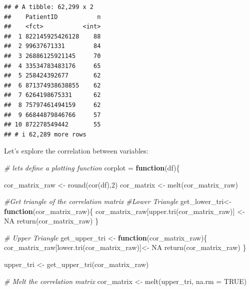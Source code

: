 \documentclass[
]{article}
\newenvironment{Shaded}{\begin{snugshade}}{\end{snugshade}}
\newcommand{\AttributeTok}[1]{\textcolor[rgb]{0.77,0.63,0.00}{#1}}
\newcommand{\CommentTok}[1]{\textcolor[rgb]{0.56,0.35,0.01}{\textit{#1}}}
\newcommand{\ConstantTok}[1]{\textcolor[rgb]{0.00,0.00,0.00}{#1}}
\newcommand{\ControlFlowTok}[1]{\textcolor[rgb]{0.13,0.29,0.53}{\textbf{#1}}}
\newcommand{\DecValTok}[1]{\textcolor[rgb]{0.00,0.00,0.81}{#1}}
\newcommand{\FunctionTok}[1]{\textcolor[rgb]{0.00,0.00,0.00}{#1}}
\newcommand{\NormalTok}[1]{#1}
\newcommand{\OtherTok}[1]{\textcolor[rgb]{0.56,0.35,0.01}{#1}}
\begin{document}
\begin{verbatim}
## # A tibble: 62,299 x 2
##    PatientID           n
##    <fct>           <int>
##  1 822145925426128    88
##  2 99637671331        84
##  3 26886125921145     70
##  4 33534783483176     65
##  5 258424392677       62
##  6 871374938638855    62
##  7 6264198675331      62
##  8 75797461494159     62
##  9 66844879846766     57
## 10 872278549442       55
## # i 62,289 more rows
\end{verbatim}

Let's explore the correlation between variables:

\begin{Shaded}
\begin{Highlighting}[]
\CommentTok{\# let\textquotesingle{}s define a plotting function}
\NormalTok{corplot }\OtherTok{=} \ControlFlowTok{function}\NormalTok{(df)\{}
  
\NormalTok{  cor\_matrix\_raw }\OtherTok{\textless{}{-}} \FunctionTok{round}\NormalTok{(}\FunctionTok{cor}\NormalTok{(df),}\DecValTok{2}\NormalTok{)}
\NormalTok{  cor\_matrix }\OtherTok{\textless{}{-}} \FunctionTok{melt}\NormalTok{(cor\_matrix\_raw)}
  
  
  \CommentTok{\#Get triangle of the correlation matrix}
  \CommentTok{\#Lower Triangle}
\NormalTok{  get\_lower\_tri}\OtherTok{\textless{}{-}}\ControlFlowTok{function}\NormalTok{(cor\_matrix\_raw)\{}
\NormalTok{    cor\_matrix\_raw[}\FunctionTok{upper.tri}\NormalTok{(cor\_matrix\_raw)] }\OtherTok{\textless{}{-}} \ConstantTok{NA}
    \FunctionTok{return}\NormalTok{(cor\_matrix\_raw)}
\NormalTok{  \}}
  
  \CommentTok{\# Upper Triangle}
\NormalTok{  get\_upper\_tri }\OtherTok{\textless{}{-}} \ControlFlowTok{function}\NormalTok{(cor\_matrix\_raw)\{}
\NormalTok{    cor\_matrix\_raw[}\FunctionTok{lower.tri}\NormalTok{(cor\_matrix\_raw)]}\OtherTok{\textless{}{-}} \ConstantTok{NA}
    \FunctionTok{return}\NormalTok{(cor\_matrix\_raw)}
\NormalTok{  \}}
  
\NormalTok{  upper\_tri }\OtherTok{\textless{}{-}} \FunctionTok{get\_upper\_tri}\NormalTok{(cor\_matrix\_raw)}
  
  \CommentTok{\# Melt the correlation matrix}
\NormalTok{  cor\_matrix }\OtherTok{\textless{}{-}} \FunctionTok{melt}\NormalTok{(upper\_tri, }\AttributeTok{na.rm =} \ConstantTok{TRUE}\NormalTok{)}
  

\end{Highlighting}
\end{Shaded}
\end{document}

